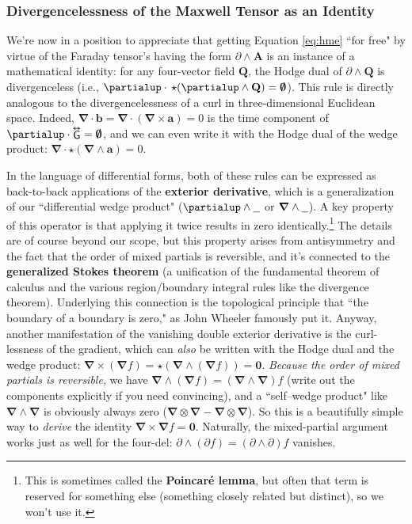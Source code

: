 \documentclass[12pt]{article}
\renewcommand{\vv}[1]{\mathbf{#1}}
\newcommand{\del}{\boldsymbol{\nabla}}
\newcommand{\tightoverset}[2]{%
  \mathop{#2}\limits^{\vbox to -.5ex{\kern-0.75ex\hbox{$#1$}\vss}}}
\newcommand{\inlinedy}[1]{\tightoverset{\text{\tiny$\bm\leftrightarrow$}}{#1}}
\begin{document}
\subsubsection{Divergencelessness of the Maxwell Tensor as an Identity}\label{sssec:dedv}

We're now in a position to appreciate that getting Equation \ref{eq:hme} ``for free" by virtue of the Faraday tensor's having the form $\partialup \wedge \vv A$ is an instance of a mathematical identity: for any four-vector field $\vv Q$, the Hodge dual of $\partialup \wedge \vv Q$ is divergenceless (i.e., $\partialup \cdot \, \star ( \partialup \wedge \vv Q ) = \textrm{\mbox{\boldmath $\emptyset$}}$). This rule is directly analogous to the divergencelessness of a curl in three-dimensional Euclidean space. Indeed, $\del \cdot \vv b = \del \cdot ( \del \times \vv a ) = 0$ is the time component of $\partialup \cdot \inlinedy{\mathsf{G}} = \textrm{\mbox{\boldmath $\emptyset$}}$, and we can even write it with the Hodge dual of the wedge product: $\del \cdot \star ( \del \wedge \vv a ) = 0$.

In the language of differential forms, both of these rules can be expressed as back-to-back applications of the \textbf{exterior derivative}, which is a generalization of our ``differential wedge product" ($\partialup \wedge \text{\underline{\hspace{.6em}}}$ or $\del \wedge \text{\underline{\hspace{.6em}}}$). A key property of this operator is that applying it twice results in zero identically.\footnote{This is sometimes called the \textbf{Poincar\'e lemma}, but often that term is reserved for something else (something closely related but distinct), so we won't use it.} The details are of course beyond our scope, but this property arises from antisymmetry and the fact that the order of mixed partials is reversible, and it's connected to the \textbf{generalized Stokes theorem} (a unification of the fundamental theorem of calculus and the various region/boundary integral rules like the divergence theorem). Underlying this connection is the topological principle that ``the boundary of a boundary is zero," as John Wheeler famously put it. Anyway, another manifestation of the vanishing double exterior derivative is the curl-lessness of the gradient, which can \emph{also} be written with the Hodge dual and the wedge product: $\del \times ( \del f ) = \star ( \del \wedge ( \del f ) ) = \vv 0 $. \emph{Because the order of mixed partials is reversible}, we have $\del \wedge ( \del f ) = ( \del \wedge \del ) f$ (write out the components explicitly if you need convincing), and a ``self--wedge product" like $ \del \wedge \del $ is obviously always zero ($\del \otimes \del - \del \otimes \del$). So this is a beautifully simple way to \emph{derive} the identity ${ \del \times \del f = \vv 0 }$. Naturally, the mixed-partial argument works just as well for the four-del: ${ \partialup \wedge ( \partialup f ) = ( \partialup \wedge \partialup ) f }$ vanishes.
\end{document}
